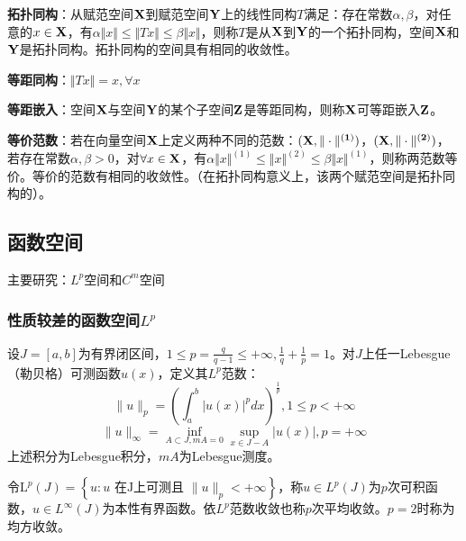 \documentclass[12pt,a4paper]{article}
\begin{document}
\textbf{拓扑同构}：从赋范空间$\bf{X}$到赋范空间$\bf{Y}$上的线性同构$T$满足：存在常数$\alpha,\beta$，对任意的$x\in \bf{X}$，有$\alpha\Vert x\Vert\leq \Vert Tx\Vert\leq \beta\Vert x \Vert$，则称$T$是从$\bf{X}$到$\bf{Y}$的一个拓扑同构，空间$\bf{X}$和$\bf{Y}$是拓扑同构。拓扑同构的空间具有相同的收敛性。

\textbf{等距同构}：$\Vert Tx\Vert=x,\forall x$

\textbf{等距嵌入}：空间$\bf{X}$与空间$\bf{Y}$的某个子空间$\bf{Z}$是等距同构，则称$\bf{X}$可等距嵌入$\bf{Z}$。

\textbf{等价范数}：若在向量空间$\bf{X}$上定义两种不同的范数：$(\bf{X},\Vert \cdot \Vert^{(1)})$，$(\bf{X},\Vert \cdot \Vert^{(2)})$，若存在常数$\alpha,\beta>0$，对$\forall x\in \bf{X}$，有$\alpha \Vert x\Vert^{(1)}\leq \Vert x\Vert^{(2)}\leq \beta\Vert x\Vert^{(1)}$，则称两范数等价。等价的范数有相同的收敛性。（在拓扑同构意义上，该两个赋范空间是拓扑同构的）。

\subsection{函数空间}
主要研究：$L^p$空间和$C^m$空间
\subsubsection{性质较差的函数空间$L^p$}
设$J=[a,b]$为有界闭区间，$1\leq p=\frac{q}{q-1}\leq +\infty,\frac{1}{q}+\frac{1}{p}=1$。对$J$上任一Lebesgue（勒贝格）可测函数$u(x)$，定义其$L^p$范数：
\begin{equation}
	\|u\|_{p}=\left(\int_{a}^{b}|u(x)|^{p} d x\right)^{\frac{1}{p}}, 1 \leq p<+\infty
\end{equation}
\begin{equation}
	\|u\|_{\infty}=\inf _{A \subset J, m A=0} \sup _{x \in J-A}|u(x)|, p=+\infty
\end{equation}
上述积分为Lebesgue积分，$mA$为Lebesgue测度。

令$\mathrm{L}^{p}(J)=\left\{u: u \text { 在J上可测且 }\|u\|_{p}<+\infty\right\}$，称$u\in L^p(J)$为$p$次可积函数，$u\in L^\infty(J)$为本性有界函数。依$L^p$范数收敛也称$p$次平均收敛。$p=2$时称为均方收敛。
\end{document}
